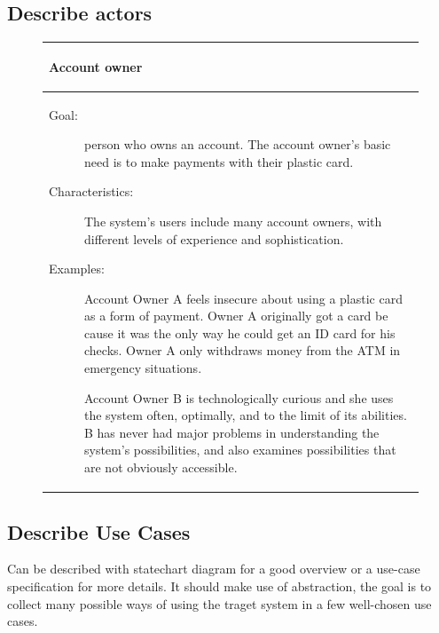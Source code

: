 \subsection*{Describe actors}
\begin{figure}
    \begin{tabular}{p{\textwidth }}
        \\\hline
        \begin{center}
            Account owner
        \end{center}
        \\\hline
        \begin{description}
            \item[Goal:] person who owns an account. The account owner’s basic need is to make payments with their plastic card.
            \item[Characteristics:] The system’s users include many account owners, with different levels of experience and sophistication.
            \item[Examples:] Account Owner A feels insecure about using a plastic card as a form of payment. Owner A originally got a card be cause it was the only way he could get an ID card for his checks. Owner A only withdraws money from the ATM in emergency situations.
            \item[] Account Owner B is technologically curious and she uses the system often, optimally, and to the limit of its abilities. B has never had major problems in understanding the system’s possibilities, and also examines possibilities that are not obviously accessible.
        \end{description}
        \\\hline
    \end{tabular}
\end{figure}
\subsection*{Describe Use Cases}
Can be described with statechart diagram for a good overview or a use-case specification for more details. It should make use of abstraction, the goal is to collect many possible ways of using the traget system in a few well-chosen use cases.